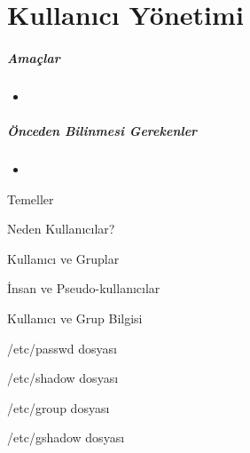 \chapter{Kullanıcı Yönetimi}
\paragraph{Amaçlar}{
\begin{itemize}
 \item 
 \end{itemize}}
\paragraph{Önceden Bilinmesi Gerekenler}
\begin{itemize}
 \item 
 \end{itemize}

\begin{section}{Temeller}

\begin{subsection}{Neden Kullanıcılar?}

\end{subsection}
\begin{subsection}{Kullanıcı ve Gruplar}

\end{subsection}
\begin{subsection}{İnsan ve Pseudo-kullanıcılar}

\end{subsection}

\end{section}



\begin{section}{Kullanıcı ve Grup Bilgisi}

\begin{subsection}{/etc/passwd dosyası}

\end{subsection}
\begin{subsection}{/etc/shadow dosyası}

\end{subsection}
\begin{subsection}{/etc/group dosyası}

\end{subsection}
\begin{subsection}{/etc/gshadow dosyası}

\end{subsection}

\end{section}


